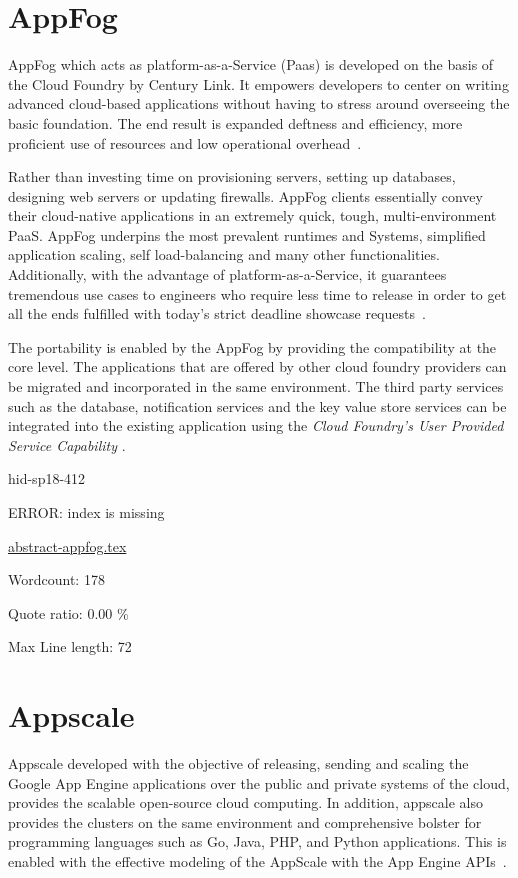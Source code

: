 \section{AppFog}

AppFog which acts as platform-as-a-Service (Paas) is developed on the
basis of the Cloud Foundry by Century Link. It empowers developers to
center on writing advanced cloud-based applications without having to
stress around overseeing the basic foundation. The end result is
expanded deftness and efficiency, more proficient use of resources and
low operational overhead~\cite{hid-sp18-412-century_link_appfog}.

Rather than investing time on provisioning servers, setting up
databases, designing web servers or updating firewalls. AppFog clients
essentially convey their cloud-native applications in an extremely
quick, tough, multi-environment PaaS. AppFog underpins the most
prevalent runtimes and Systems, simplified application scaling, self
load-balancing and many other functionalities. Additionally, with the
advantage of platform-as-a-Service, it guarantees tremendous use cases
to engineers who require less time to release in order to get all the
ends fulfilled with today's strict deadline showcase
requests~\cite{hid-sp18-412-century_link_appfog}.

The portability is enabled by the AppFog by providing the
compatibility at the core level. The applications that are offered by
other cloud foundry providers can be migrated and incorporated in the
same environment.  The third party services such as the database,
notification services and the key value store services can be
integrated into the existing application using the \emph{Cloud Foundry's
User Provided Service Capability}
\cite{hid-sp18-412-century_link_appfog}.



\begin{IU}

hid-sp18-412

ERROR: index is missing

\href{https://github.com/cloudmesh-community/hid-sp18-412/blob/master//technology/abstract-appfog.tex}{abstract-appfog.tex}

 

Wordcount: 178


Quote ratio: 0.00 \%
 
Max Line length: 72
\end{IU}

\section{Appscale}
Appscale developed with the objective of releasing, sending and scaling 
the Google App Engine applications over the public and private systems 
of the cloud, provides the scalable open-source cloud computing. 
In addition, appscale also provides the clusters on the same environment 
and comprehensive bolster for programming languages such as Go, Java, PHP, 
and Python applications. This is enabled with the effective modeling
of the AppScale with the App Engine APIs~\cite{hid-sp18-412-wiki_appscale}.

